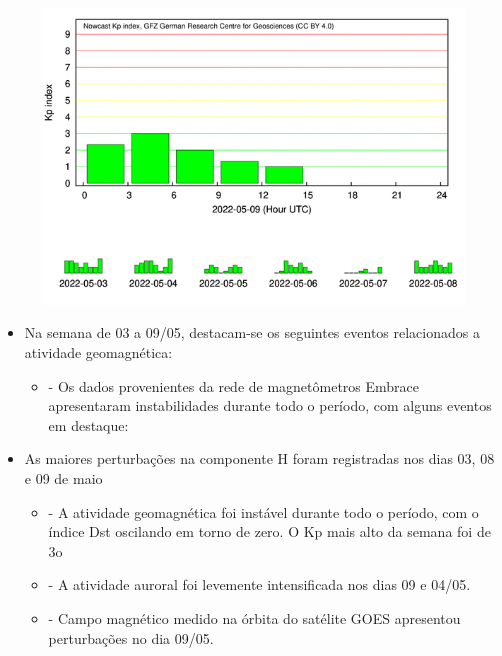 \documentclass[a4paper, 10pt]{article}
\begin{document}
                     \begin{figure}[H]
    
                        \centering
   
                             \includegraphics[width=14cm]{./figures//figureGeomag_6.png}

                        \end{figure}

                     \begin{itemize} 
\item Na semana de 03 a 09/05, destacam-se os seguintes eventos relacionados a atividade geomagnética:
\begin{itemize} 
 \item - Os dados provenientes da rede de magnetômetros Embrace apresentaram instabilidades durante todo o período, com alguns eventos em destaque:
 \end{itemize} 
\item As maiores perturbações na componente H foram registradas nos dias 03, 08 e 09 de maio
\begin{itemize} 
 \item - A atividade geomagnética foi instável durante todo o período, com o índice Dst oscilando em torno de zero. O Kp mais alto da semana foi de 3o
 \end{itemize} 
\begin{itemize} 
 \item - A atividade auroral foi levemente intensificada nos dias 09 e 04/05.
 \end{itemize} 
\begin{itemize} 
 \item - Campo magnético medido na órbita do satélite GOES apresentou perturbações no dia 09/05.
 \end{itemize} 
\end{itemize} 
\end{document}
